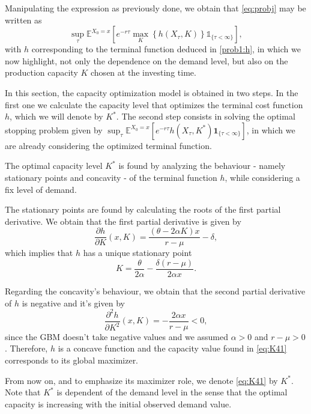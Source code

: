Manipulating the expression as previously done, we obtain that \eqref{eq:probj} may be written as
\begin{equation}
\sup_\tau \mathds{E}^{X_0=x} \left[ e^{-r\tau } \max_K \left\{ h(X_\tau,K) \right\} \mathds{1}_{\{\tau<\infty\}} \right],
\label{eq:q1}
\end{equation}
with $h$ corresponding to the terminal function deduced in \eqref{prob1:h}, in which we now highlight, not only the dependence on the demand level, but also on the production capacity $K$ chosen at the investing time.

In this section, the capacity optimization model is obtained in two steps. In the first one we calculate the capacity level that optimizes the terminal cost function $h$, which we will denote by $K^*$. The second step consists in solving the optimal stopping problem given by $\sup_\tau \mathds{E}^{X_0=x}\left[e^{-r\tau}h(X_\tau,K^*) \textbf{1}_{\{\tau<\infty\}} \right]$, in which we are already considering the optimized terminal function.

The optimal capacity level $K^*$ is found by analyzing the behaviour - namely stationary points and concavity  - of the terminal function $h$, while considering a fix level of demand.

The stationary points are found by calculating the roots of the first partial derivative.
We obtain that the  first partial derivative is given by
\begin{equation}
\frac{\partial h }{\partial K}(x,K)=  \frac{(\theta-2\alpha K)x}{r-\mu} - \delta,
\label{1_dK}
\end{equation}
which implies that $h$ has a unique stationary point
\begin{equation}
K=\frac{\theta}{2\alpha}-\frac{\delta (r-\mu)}{2 \alpha x}. 
\label{eq:K41}
\end{equation}

Regarding the concavity's behaviour, we obtain that the second partial derivative of $h$ is negative and it's given by
\begin{equation}
\frac{\partial^2 h }{\partial K^2}(x,K)=  -\frac{2\alpha x}{r-\mu}<0,
\label{1_d2K}
\end{equation}
since the GBM doesn't take negative values and we assumed $\alpha>0$ and $r-\mu>0$ . Therefore, $h$ is a concave function and the capacity value found in \eqref{eq:K41} corresponds to its global maximizer.

From now on, and to emphasize its maximizer role, we denote \eqref{eq:K41} by $K^*$.
Note that $K^*$ is dependent of the demand level in the sense that the optimal capacity is increasing with the initial observed demand value.

